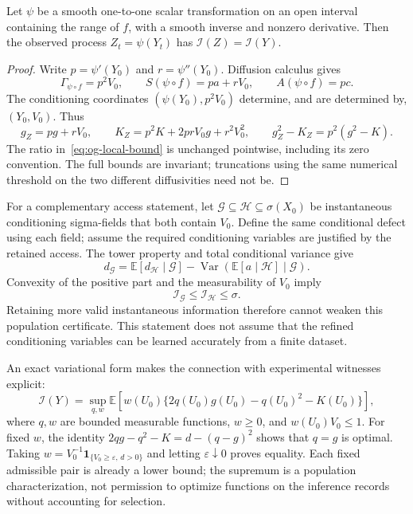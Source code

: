 \begin{proposition}
\label{prop:og-recalibration}
Let $\psi$ be a smooth one-to-one scalar transformation on an open interval
containing the range of $f$, with a smooth inverse and nonzero derivative.
Then the observed process $Z_t=\psi(Y_t)$ has
$\mathcal I(Z)=\mathcal I(Y)$.
\end{proposition}

\begin{proof}
Write $p=\psi'(Y_0)$ and $r=\psi''(Y_0)$. Diffusion calculus gives
\[
 \Gamma_{\psi\circ f}=p^2V_0,\qquad
 S(\psi\circ f)=p a+rV_0,\qquad
 A(\psi\circ f)=p c.
\]
The conditioning coordinates $(\psi(Y_0),p^2V_0)$ determine, and are
determined by, $(Y_0,V_0)$. Thus
\[
 g_Z=pg+rV_0,\qquad
 K_Z=p^2K+2prV_0g+r^2V_0^2,
 \qquad g_Z^2-K_Z=p^2(g^2-K).
\]
The ratio in~\eqref{eq:og-local-bound} is unchanged pointwise, including
its zero convention. The full bounds are invariant; truncations using the
same numerical threshold on the two different diffusivities need not be.
\end{proof}

For a complementary access statement, let $\mathcal G\subseteq\mathcal H
\subseteq\sigma(X_0)$ be instantaneous conditioning sigma-fields that both
contain $V_0$. Define the same conditional defect using each field; assume
the required conditioning variables are justified by the retained access.
The tower property and total conditional variance give
\[
 d_{\mathcal G}
 =\mathbb E[d_{\mathcal H}\mid\mathcal G]
  -\operatorname{Var}\!\left(
       \mathbb E[a\mid\mathcal H]\mid\mathcal G\right).
\]
Convexity of the positive part and the measurability of $V_0$ imply
\begin{equation}
 \mathcal I_{\mathcal G}\leq\mathcal I_{\mathcal H}\leq\sigma.
 \label{eq:og-refinement}
\end{equation}
Retaining more valid instantaneous information therefore cannot weaken this
population certificate. This statement does not assume that the refined
conditioning variables can be learned accurately from a finite dataset.

An exact variational form makes the connection with experimental witnesses
explicit:
\begin{equation}
 \mathcal I(Y)=
 \sup_{q,w}\mathbb E\!\left[
 w(U_0)\{2q(U_0)g(U_0)-q(U_0)^2-K(U_0)\}\right],
 \label{eq:og-dual}
\end{equation}
where $q,w$ are bounded measurable functions, $w\geq0$, and $w(U_0)V_0\leq1$.
For fixed $w$, the identity
$2qg-q^2-K=d-(q-g)^2$ shows that $q=g$ is optimal. Taking
$w=V_0^{-1}\mathbf 1_{\{V_0\geq\varepsilon,\,d>0\}}$ and letting
$\varepsilon\downarrow0$ proves equality. Each fixed admissible pair is
already a lower bound; the supremum is a population characterization, not
permission to optimize functions on the inference records without accounting
for selection.

